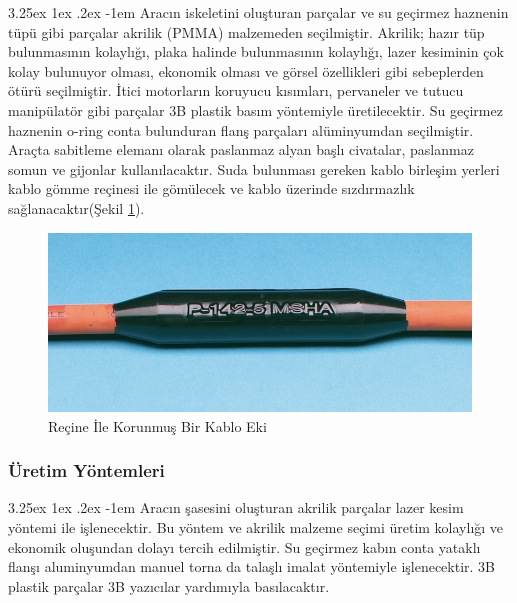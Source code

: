 \documentclass[12pt]{article}
\makeatletter
\renewcommand\paragraph{\@startsection{paragraph}{5}{\z@}%
  {3.25ex \@plus1ex \@minus.2ex}%
  {-1em}%
  {\normalfont\normalsize\bfseries}}
\makeatother
\begin{document}
\paragraph{} Aracın iskeletini oluşturan parçalar ve su geçirmez haznenin tüpü gibi parçalar akrilik (PMMA) malzemeden seçilmiştir. Akrilik; hazır tüp bulunmasının kolaylığı, plaka halinde bulunmasının kolaylığı, lazer kesiminin çok kolay bulunuyor olması, ekonomik olması ve görsel özellikleri gibi sebeplerden ötürü seçilmiştir. İtici motorların koruyucu kısımları, pervaneler ve tutucu manipülatör gibi parçalar 3B plastik basım yöntemiyle üretilecektir. Su geçirmez haznenin o-ring conta bulunduran flanş parçaları alüminyumdan seçilmiştir. Araçta sabitleme elemanı olarak paslanmaz alyan başlı civatalar, paslanmaz somun ve gijonlar kullanılacaktır. Suda bulunması gereken kablo birleşim yerleri kablo gömme reçinesi ile gömülecek ve kablo üzerinde  sızdırmazlık sağlanacaktır(Şekil \ref{fig:inlinesplice}).

\begin{figure}[hbt!]
\centering
 \begin{adjustbox}{width=10cm}
\includegraphics[width=1\textwidth]{images/inlinesplice.jpg}
 \end{adjustbox}
\caption{Reçine İle Korunmuş Bir Kablo Eki}
\label{fig:inlinesplice}
\end{figure}

\subsubsection{Üretim Yöntemleri}

\paragraph{} Aracın şasesini oluşturan akrilik parçalar lazer kesim yöntemi ile işlenecektir. Bu yöntem ve akrilik malzeme seçimi üretim kolaylığı ve ekonomik oluşundan dolayı tercih edilmiştir. Su geçirmez kabın conta yataklı flanşı aluminyumdan manuel torna da talaşlı imalat yöntemiyle işlenecektir. 3B plastik parçalar 3B yazıcılar yardımıyla basılacaktır.
\end{document}
